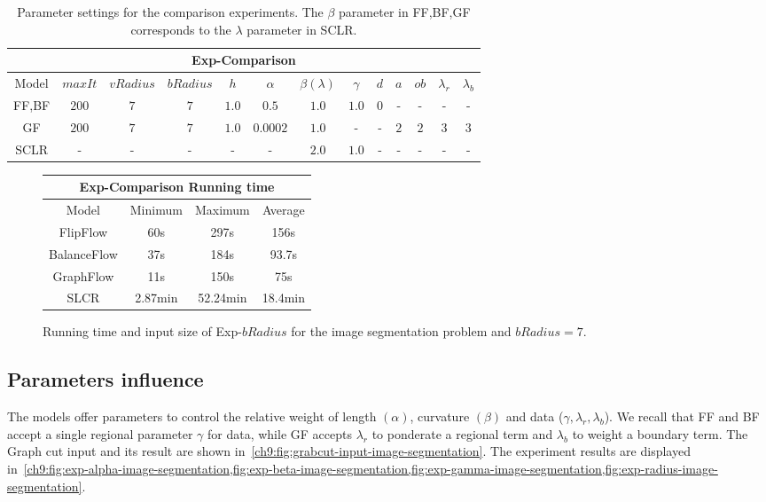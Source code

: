 \begin{table}
\centering
\begin{tabular}{|c|c|c|c|c|c|c|c|c|c|c|c|c|}
\hline
\multicolumn{13}{|c|}{Exp-Comparison}\\
\hline
Model & $maxIt$ & $vRadius$ & $bRadius$ & $h$ & $\alpha$ & $\beta (\lambda)$  & $\gamma$ & $d$ & $a$ & $ob$ & $\lambda_r$ & $\lambda_b$ \\
\hline
FF,BF & $200$ & $7$ & $7$ & $1.0$ & $0.5$ & $1.0$ & $1.0$ & $0$ & - & - & - & -\\
\hline
GF & $200$ & $7$ & $7$ & $1.0$ & $0.0002$ & $1.0$ & - & - & $2$ & $2$ & $3$ & $3$\\
\hline
SCLR & - & - & - & - & - & $2.0$ & $1.0$ & - & - & - & - & -\\
\hline
\end{tabular}
\caption{Parameter settings for the comparison experiments. The $\beta$ parameter in FF,BF,GF corresponds to the $\lambda$ parameter in SCLR.}
\label{ch9:tab:image-segmentation-comparison-summary}
\end{table}

\begin{figure}
\center
\captionsetup{type=table}
\begin{tabular}{|c|c|c|c|}
\hline
\multicolumn{4}{|c|}{Exp-Comparison Running time}\\
\hline
Model & Minimum & Maximum & Average \\
\hline
FlipFlow & 60s & 297s & 156s\\
BalanceFlow & 37s & 184s & 93.7s\\
GraphFlow & 11s & 150s & 75s\\
SLCR & 2.87min & 52.24min & 18.4min\\
\hline
\end{tabular}
\caption{Running time and input size of Exp-$bRadius$ for the image segmentation problem and $bRadius=7$.}
\label{ch9:tab:rtime-image-segmentation-general} 
\end{figure}

\subsection{Parameters influence}
The models offer parameters to control the relative weight of length $(\alpha)$, curvature $(\beta)$ and data ($\gamma,\lambda _r, \lambda _b$). We recall that FF and BF accept a single regional parameter $\gamma$ for data, while GF accepts $\lambda _r$ to ponderate a regional term and $\lambda _b$ to weight a boundary term. The Graph cut input and its result are shown in~\cref{ch9:fig:grabcut-input-image-segmentation}. The experiment results are displayed in~\cref{ch9:fig:exp-alpha-image-segmentation,fig:exp-beta-image-segmentation,fig:exp-gamma-image-segmentation,fig:exp-radius-image-segmentation}. 

